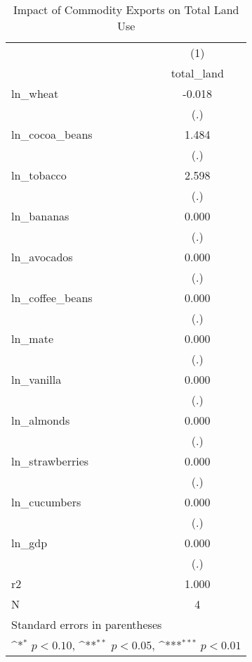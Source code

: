 \begin{table}[htbp]\centering
\def\sym#1{\ifmmode^{#1}\else\(^{#1}\)\fi}
\caption{Impact of Commodity Exports on Total Land Use\label{tab1}}
\begin{tabular}{l*{1}{c}}
\toprule
            &\multicolumn{1}{c}{(1)}\\
            &\multicolumn{1}{c}{total\_land}\\
\midrule
ln\_wheat    &      -0.018         \\
            &         (.)         \\
\addlinespace
ln\_cocoa\_beans&       1.484         \\
            &         (.)         \\
\addlinespace
ln\_tobacco  &       2.598         \\
            &         (.)         \\
\addlinespace
ln\_bananas  &       0.000         \\
            &         (.)         \\
\addlinespace
ln\_avocados &       0.000         \\
            &         (.)         \\
\addlinespace
ln\_coffee\_beans&       0.000         \\
            &         (.)         \\
\addlinespace
ln\_mate     &       0.000         \\
            &         (.)         \\
\addlinespace
ln\_vanilla  &       0.000         \\
            &         (.)         \\
\addlinespace
ln\_almonds  &       0.000         \\
            &         (.)         \\
\addlinespace
ln\_strawberries&       0.000         \\
            &         (.)         \\
\addlinespace
ln\_cucumbers&       0.000         \\
            &         (.)         \\
\addlinespace
ln\_gdp      &       0.000         \\
            &         (.)         \\
\midrule
r2          &       1.000         \\
N           &           4         \\
\bottomrule
\multicolumn{2}{l}{\footnotesize Standard errors in parentheses}\\
\multicolumn{2}{l}{\footnotesize \sym{*} \(p<0.10\), \sym{**} \(p<0.05\), \sym{***} \(p<0.01\)}\\
\end{tabular}
\end{table}
